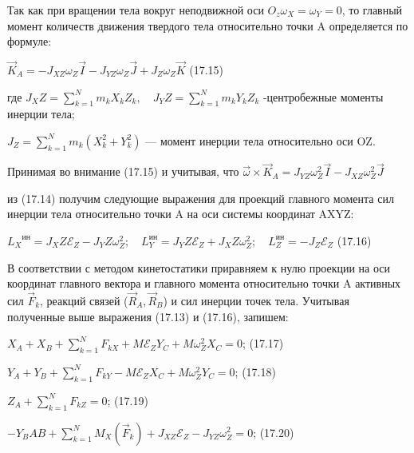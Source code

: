 {\begin{center}
    \par Так как при вращении тела вокруг неподвижной оси $O_z\omega_X=\omega_Y=0 $, то главный момент количеств движения твердого тела относительно точки A определяется по формуле: 
    
    \par $\vec{K}_A=-J_{XZ}\omega_Z\vec{I} - J_{YZ}\omega_Z\vec{J} + J_Z\omega_Z\vec{K}$ \qquad (17.15)
    
    \par где $J_XZ= \sum\limits_{k=1}^Nm_kX_kZ_k, \quad J_YZ= \sum\limits_{k=1}^Nm_kY_kZ_k$ -центробежные моменты инерции тела;
    
    \par $J_Z= \sum\limits_{k=1}^Nm_k(X_k^2+Y_k^2)$ — момент инерции тела относительно оси OZ.
    
    \par Принимая во внимание (17.15) и учитывая, что $\Vec{\omega}\times\Vec{K}_A = J_{YZ}\omega_Z^2\vec{I} - J_{XZ}\omega_Z^2\vec{J} $ 
    
    \par из  (17.14) получим следующие  выражения  для  проекций  главного  момента сил инерции тела относительно точки A на оси системы координат AXYZ:
    
    \par ${L_X}^{\text{ин}}=J_XZ\mathcal{E}_Z-J_YZ\omega_Z^2; \quad L_Y^{\text{ин}}=J_YZ\mathcal{E}_Z+J_XZ\omega_Z^2
    ; \quad L_Z^{\text{ин}}=-J_Z\mathcal{E}_Z $ \quad (17.16)
    
    \par В соответствии с методом кинетостатики приравняем к нулю проекции на оси координат главного вектора и главного момента относительно точки A активных сил $\vec{F}_k $, реакций связей ($\vec{R}_A, \vec{R}_B $) и сил инерции точек тела. Учитывая полученные выше выражения (17.13) и (17.16), запишем:

    \par $X_A + X_B + \sum\limits_{k=1}^NF_{kX}+M\mathcal{E}_ZY_C+M\omega_Z^2X_C=0$; \qquad (17.17)

    \par $Y_A + Y_B + \sum\limits_{k=1}^NF_{kY}-M\mathcal{E}_ZX_C+M\omega_Z^2Y_C=0$; \qquad (17.18)

    \par $Z_A + \sum\limits_{k=1}^NF_{kZ}=0$; \qquad (17.19)

    \par $-Y_BAB+ \sum\limits_{k=1}^N M_X(\Vec{F}_k)+ J_{XZ}\mathcal{E}_Z-J_{YZ}\omega_Z^2=0$; \qquad (17.20)


\end{center}}
